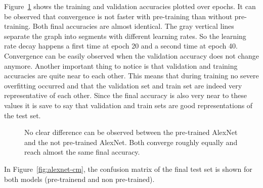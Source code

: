 Figure~\ref{fig:alexnet-graph} shows the training and validation accuracies plotted over epochs. It can be observed that convergence is not faster with pre-training than without pre-training. Both final accuracies are almost identical. The gray vertical lines separate the graph into segments with different learning rates. So the learning rate decay happens a first time at epoch 20 and a second time at epoch 40. Convergence can be easily observed when the validation accuracy does not change anymore. Another important thing to notice is that validation and training accuracies are quite near to each other. This means that during training no severe overfitting occurred and that the validation set and train set are indeed very representative of each other. Since the final accuracy is also very near to these values it is save to say that validation and train sets are good representations of the test set. \\


\begin{figure}[!h]
\centering
\caption{No clear difference can be observed between the pre-trained AlexNet and the not pre-trained AlexNet. Both converge roughly equally and reach almost the same final accuracy.}
\label{fig:alexnet-graph}
\end{figure}

In Figure~\ref{fig:alexnet-cm}, the confusion matrix of the final test set is shown for both models (pre-trainend and non pre-trained). \\


